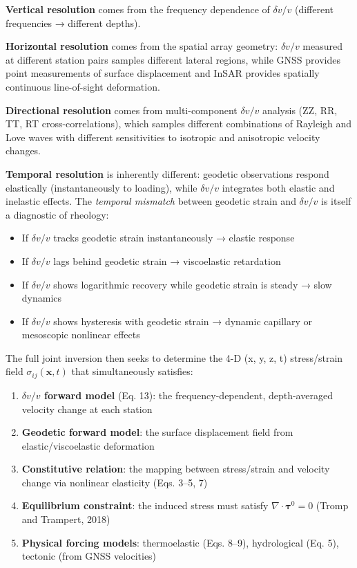 \documentclass[12pt]{article}
\providecommand{\tightlist}{%
  \setlength{\itemsep}{0pt}\setlength{\parskip}{0pt}}
\begin{document}
\textbf{Vertical resolution} comes from the frequency dependence of
\(\delta v/v\) (different frequencies → different depths).

\textbf{Horizontal resolution} comes from the spatial array geometry:
\(\delta v/v\) measured at different station pairs samples different
lateral regions, while GNSS provides point measurements of surface
displacement and InSAR provides spatially continuous line-of-sight
deformation.

\textbf{Directional resolution} comes from multi-component
\(\delta v/v\) analysis (ZZ, RR, TT, RT cross-correlations), which
samples different combinations of Rayleigh and Love waves with different
sensitivities to isotropic and anisotropic velocity changes.

\textbf{Temporal resolution} is inherently different: geodetic
observations respond elastically (instantaneously to loading), while
\(\delta v/v\) integrates both elastic and inelastic effects. The
\emph{temporal mismatch} between geodetic strain and \(\delta v/v\) is
itself a diagnostic of rheology:

\begin{itemize}
\tightlist
\item
  If \(\delta v/v\) tracks geodetic strain instantaneously → elastic
  response
\item
  If \(\delta v/v\) lags behind geodetic strain → viscoelastic
  retardation
\item
  If \(\delta v/v\) shows logarithmic recovery while geodetic strain is
  steady → slow dynamics
\item
  If \(\delta v/v\) shows hysteresis with geodetic strain → dynamic
  capillary or mesoscopic nonlinear effects
\end{itemize}

The full joint inversion then seeks to determine the 4-D (x, y, z, t)
stress/strain field \(\sigma_{ij}(\mathbf{x}, t)\) that simultaneously
satisfies:

\begin{enumerate}
\def\labelenumi{\arabic{enumi}.}
\tightlist
\item
  \textbf{\(\delta v/v\) forward model} (Eq. 13): the
  frequency-dependent, depth-averaged velocity change at each station
\item
  \textbf{Geodetic forward model}: the surface displacement field from
  elastic/viscoelastic deformation
\item
  \textbf{Constitutive relation}: the mapping between stress/strain and
  velocity change via nonlinear elasticity (Eqs. 3--5, 7)
\item
  \textbf{Equilibrium constraint}: the induced stress must satisfy
  \(\nabla \cdot \boldsymbol{\tau}^0 = 0\) (Tromp and Trampert, 2018)
\item
  \textbf{Physical forcing models}: thermoelastic (Eqs. 8--9),
  hydrological (Eq. 5), tectonic (from GNSS velocities)
\end{enumerate}
\end{document}
